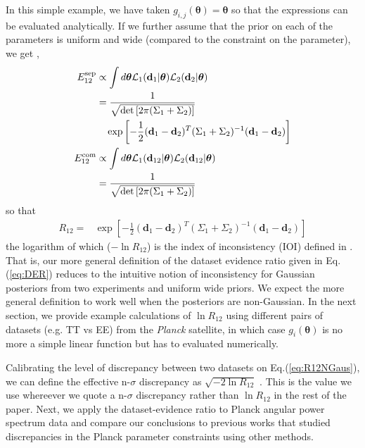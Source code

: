 \documentclass[amsmath, prd, reprint, aps]{revtex4-1}
\newcommand{\dv}{\textbf{d}}
\newcommand{\donev}{\textbf{d}_1}
\newcommand{\dtwov}{\textbf{d}_2}
\newcommand{\tv}{\bm{\theta}}
\newcommand{\saroj}[1]{\textcolor{blue}{(Saroj: #1)}}
\begin{document}
In this simple example, we have taken $g_{i,j}(\tv) = \tv$ so that the expressions can be evaluated analytically. If we further assume that the prior on each of the parameters is uniform and wide (compared to the constraint on the parameter), we get \cite{IMM2012-03274},
\begin{align}
	E_{12}^{\rm sep} &\propto \int d\tv \mathcal{L}_1(\dv_1|\tv) \mathcal{L}_2(\dv_2|\tv) \nonumber \\
    &= \frac{1}{\sqrt{\det\left[2\pi(\Sigma_1+\Sigma_2)\right]}} \nonumber \\ &~~~ \exp \left[-\frac{1}{2}(\donev-\dtwov)^T(\Sigma_1+\Sigma_2)^{-1}(\donev-\dtwov)\right] \\
    E_{12}^{\rm com} &\propto \int d\tv \mathcal{L}_1(\dv_{12}|\tv) \mathcal{L}_2(\dv_{12}|\tv) \nonumber \\
    &= \frac{1}{\sqrt{\det\left[2\pi(\Sigma_1 + \Sigma_2)\right]}}
\end{align}
so that
\begin{align}
R_{12} =& \exp \left[-\frac{1}{2}(\donev-\dtwov)^T(\Sigma_1+\Sigma_2)^{-1}(\donev-\dtwov)\right] \label{eq:R12NGaus}
\end{align}
the logarithm of which ($-\ln R_{12}$) is the index of inconsistency (IOI) defined in \cite{Lin:2017ikq}. That is, our more general definition of the dataset evidence ratio given in Eq.(\ref{eq:DER}) reduces to the intuitive notion of inconsistency for Gaussian posteriors from two experiments and uniform wide priors. We expect the more general definition to work well when the posteriors are non-Gaussian.
In the next section, we provide example calculations of $\ln R_{12}$ using different pairs of datasets (e.g. TT vs EE) from the {\it Planck} satellite, in which case $g_i(\tv)$ is no more a simple linear function but has to evaluated numerically.

Calibrating the level of discrepancy between two datasets on Eq.(\ref{eq:R12NGaus}), we can define the effective n-$\sigma$ discrepancy as $\sqrt{-2 \ln R_{12}}$ \cite{Lin:2017bhs}. This is the value we use whereever we quote a n-$\sigma$ discrepancy rather than $\ln R_{12}$ in the rest of the paper. Next, we apply the dataset-evidence ratio to Planck angular power spectrum data and compare our conclusions to previous works that studied discrepancies in the Planck parameter constraints using other methods.
\end{document}
